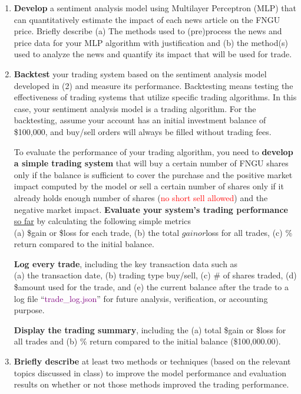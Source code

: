 \documentclass[twocolumn,12pt]{article}
\begin{document}
\begin{multicols}{2}
\begin{flushleft}
\begin{enumerate}
	\item \textbf{Develop} a sentiment analysis model using Multilayer Perceptron (MLP) that can quantitatively estimate the impact of each news article on the FNGU price. Briefly describe 
		\subitem (a) The methods used to (pre)process the news and price data for your MLP algorithm with justification and 
		\subitem (b) the method(s) used to analyze the news and quantify its impact that will be used for trade.
	
	\item \textbf{Backtest} your trading system based on the sentiment analysis model developed in (2) and measure its performance. Backtesting means testing the effectiveness of trading systems that utilize specific trading algorithms. In this case, your sentiment analysis model is a trading algorithm. For the backtesting, assume your account has an initial investment balance of \$100,000, and buy/sell orders will always be filled without trading fees. 

	To evaluate the performance of your trading algorithm, you need to \textbf{develop a simple trading system} that will buy a certain number of FNGU shares only if the balance is sufficient to cover the purchase and the positive market impact computed by the model or sell a certain number of shares only if it already holds enough number of shares (\textcolor{red}{no short sell allowed}) and the negative market impact. 
	\textbf{Evaluate your system’s trading performance} \underline{so far} by calculating the following simple metrics\\
		\subitem (a) \$gain or \$loss for each trade, 
		\subitem (b) the total $gain or $loss for all trades, 
		\subitem (c) \% return compared to the initial balance. 
		
	\textbf{Log every trade}, including the key transaction data such as\\
		\subitem (a) the transaction date, 
		\subitem (b) trading type buy/sell, 
		\subitem (c) \# of shares traded, 
		\subitem (d) \$amount used for the trade, and 
		\subitem (e) the current balance after the trade to a log file \enquote{\textcolor{purple}{trade\_log.json}} for future analysis, verification, or accounting purpose.
		
	\textbf{Display the trading summary}, including the 
		\subitem (a) total \$gain or \$loss for all trades and
		\subitem (b) \% return compared to the initial balance (\$100,000.00).

	\item \textbf{Briefly describe} at least two methods or techniques (based on the relevant topics discussed in class) to improve the model performance and evaluation results on whether or not those methods improved the trading performance.
	

\end{enumerate}
\end{flushleft}
\end{multicols}
\end{document}
